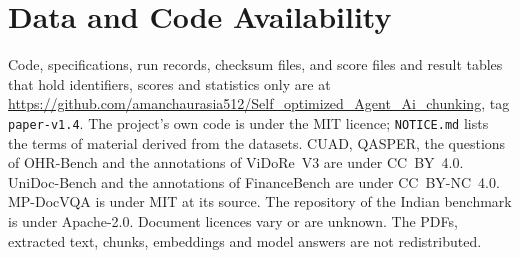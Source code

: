 \section*{Data and Code Availability}
Code, specifications, run records, checksum files, and score files and result
tables that hold identifiers, scores and statistics only are at
\url{https://github.com/amanchaurasia512/Self_optimized_Agent_Ai_chunking}, tag
\texttt{paper-v1.4}. The project's own code is under the MIT licence;
\texttt{NOTICE.md} lists the terms of material derived from the datasets. CUAD,
QASPER, the questions of OHR-Bench and the annotations of ViDoRe~V3 are under CC~BY~4.0. UniDoc-Bench and the annotations of FinanceBench are under
CC~BY-NC~4.0. MP-DocVQA is under MIT at its source. The repository of the Indian
benchmark is under Apache-2.0. Document licences vary or are unknown. The PDFs, extracted text,
chunks, embeddings and model answers are not redistributed.
